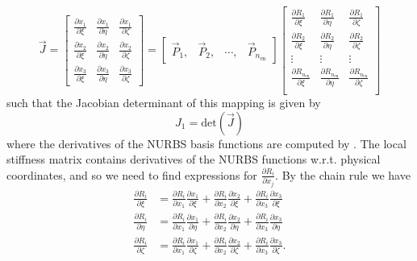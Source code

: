 \begin{equation}\label{Eq:NURBSjacobian}
	\vec{J} = \begin{bmatrix}
		\frac{\partial x_1}{\partial \xi} & \frac{\partial x_1}{\partial \eta} & \frac{\partial x_1}{\partial \zeta}\\
		\frac{\partial x_2}{\partial \xi} & \frac{\partial x_2}{\partial \eta} & \frac{\partial x_2}{\partial \zeta}\\
		\frac{\partial x_3}{\partial \xi} & \frac{\partial x_3}{\partial \eta} & \frac{\partial x_3}{\partial \zeta}
		\end{bmatrix} = \begin{bmatrix}
		\vec{P}_1, & \vec{P}_2, & \cdots, & \vec{P}_{n_{\mathrm{en}}}
		\end{bmatrix}\begin{bmatrix}
			\frac{\partial R_1}{\partial \xi} & \frac{\partial R_1}{\partial \eta} & \frac{\partial R_1}{\partial \zeta}\\
			\frac{\partial R_2}{\partial \xi} & \frac{\partial R_2}{\partial \eta} & \frac{\partial R_2}{\partial \zeta}\\
			\vdots &\vdots &\vdots \\
			\frac{\partial R_{n_{\mathrm{en}}}}{\partial \xi} & \frac{\partial R_{n_{\mathrm{en}}}}{\partial \eta} & \frac{\partial R_{n_{\mathrm{en}}}}{\partial \zeta}\\
		\end{bmatrix}
\end{equation} 
such that the Jacobian determinant of this mapping is given by
\begin{equation*}
	J_1 = \mathrm{det}(\vec{J})
\end{equation*}
where the derivatives of the NURBS basis functions are computed by . The local stiffness matrix contains derivatives of the NURBS functions w.r.t. physical coordinates, and so we need to find expressions for $\frac{\partial R_i}{\partial x_j}$. By the chain rule we have
\begin{align*}
	\frac{\partial R_i}{\partial \xi} &= \frac{\partial R_i}{\partial x_1}\frac{\partial x_1}{\partial \xi} + \frac{\partial R_i}{\partial x_2}\frac{\partial x_2}{\partial \xi} + \frac{\partial R_i}{\partial x_3}\frac{\partial x_3}{\partial \xi}\\
	\frac{\partial R_i}{\partial \eta} &= \frac{\partial R_i}{\partial x_1}\frac{\partial x_1}{\partial \eta} + \frac{\partial R_i}{\partial x_2}\frac{\partial x_2}{\partial \eta} + \frac{\partial R_i}{\partial x_3}\frac{\partial x_3}{\partial \eta}\\
	\frac{\partial R_i}{\partial \zeta} &= \frac{\partial R_i}{\partial x_1}\frac{\partial x_1}{\partial \zeta} + \frac{\partial R_i}{\partial x_2}\frac{\partial x_2}{\partial \zeta} + \frac{\partial R_i}{\partial x_3}\frac{\partial x_3}{\partial \zeta}.
\end{align*}
